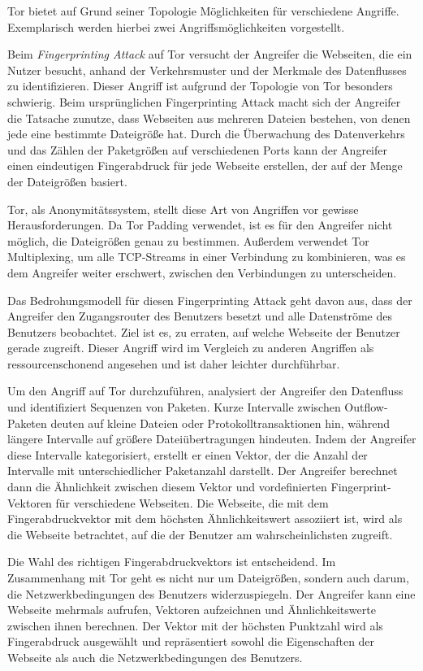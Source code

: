 Tor bietet auf Grund seiner Topologie Möglichkeiten für verschiedene Angriffe. Exemplarisch werden hierbei zwei Angriffsmöglichkeiten vorgestellt.

Beim \textit{Fingerprinting Attack} auf Tor versucht der Angreifer die Webseiten, die ein Nutzer besucht, anhand der Verkehrsmuster und der Merkmale des Datenflusses zu identifizieren. Dieser Angriff ist aufgrund der Topologie von Tor besonders schwierig. Beim ursprünglichen Fingerprinting Attack macht sich der Angreifer die Tatsache zunutze, dass Webseiten aus mehreren Dateien bestehen, von denen jede eine bestimmte Dateigröße hat. Durch die Überwachung des Datenverkehrs und das Zählen der Paketgrößen auf verschiedenen Ports kann der Angreifer einen eindeutigen Fingerabdruck für jede Webseite erstellen, der auf der Menge der Dateigrößen basiert\cite{AttacksOnTor}.

Tor, als Anonymitätssystem, stellt diese Art von Angriffen vor gewisse Herausforderungen. Da Tor Padding verwendet, ist es für den Angreifer nicht möglich, die Dateigrößen genau zu bestimmen. Außerdem verwendet Tor Multiplexing, um alle TCP-Streams in einer Verbindung zu kombinieren, was es dem Angreifer weiter erschwert, zwischen den Verbindungen zu unterscheiden.

Das Bedrohungsmodell für diesen Fingerprinting Attack geht davon aus, dass der Angreifer den Zugangsrouter des Benutzers besetzt und alle Datenströme des Benutzers beobachtet. Ziel ist es, zu erraten, auf welche Webseite der Benutzer gerade zugreift. Dieser Angriff wird im Vergleich zu anderen Angriffen als ressourcenschonend angesehen und ist daher leichter durchführbar.

Um den Angriff auf Tor durchzuführen, analysiert der Angreifer den Datenfluss und identifiziert Sequenzen von Paketen. Kurze Intervalle zwischen Outflow-Paketen deuten auf kleine Dateien oder Protokolltransaktionen hin, während längere Intervalle auf größere Dateiübertragungen hindeuten. Indem der Angreifer diese Intervalle kategorisiert, erstellt er einen Vektor, der die Anzahl der Intervalle mit unterschiedlicher Paketanzahl darstellt. Der Angreifer berechnet dann die Ähnlichkeit zwischen diesem Vektor und vordefinierten Fingerprint-Vektoren für verschiedene Webseiten. Die Webseite, die mit dem Fingerabdruckvektor mit dem höchsten Ähnlichkeitswert assoziiert ist, wird als die Webseite betrachtet, auf die der Benutzer am wahrscheinlichsten zugreift\cite{AttackInTor}.

Die Wahl des richtigen Fingerabdruckvektors ist entscheidend. Im Zusammenhang mit Tor geht es nicht nur um Dateigrößen, sondern auch darum, die Netzwerkbedingungen des Benutzers widerzuspiegeln. Der Angreifer kann eine Webseite mehrmals aufrufen, Vektoren aufzeichnen und Ähnlichkeitswerte zwischen ihnen berechnen. Der Vektor mit der höchsten Punktzahl wird als Fingerabdruck ausgewählt und repräsentiert sowohl die Eigenschaften der Webseite als auch die Netzwerkbedingungen des Benutzers\cite{FingerprintingOnTorAttack}.

